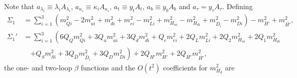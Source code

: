 \documentclass[preprint,amsmath,amssymb,aps,superscriptaddress,prd,showpacs,floatfix,nofootinbib]{revtex4-1}
\begin{document}
Note that $a_{\lambda_i}\equiv\lambda_i A_{\lambda_i}$, $a_{\kappa_i}\equiv\kappa_i A_{\kappa_i}$, $a_t\equiv y_t A_t$, $a_b\equiv y_b A_b$ and $a_\tau= y_\tau A_\tau$. Defining 
\begin{align}
\Sigma_1&=\sum_{i=1}^3\left ( m_{Qi}^2-2m_{ui}^2+m_{di}^2+m_{ei}^2-m_{Li}^2+m_{H_{ui}}^2-m_{H_{di}}^2+m_{\overline{D}_i}^2-m_{Di}^2\right )-m_{H'}^2+m_{\overline{H'}}^2,\label{eq:USSMGaugeSigmaTerm1}\\
\Sigma_1'&=\sum_{i=1}^3\left ( 6Q_Qm_{Qi}^2+3Q_um_{ui}^2+3Q_dm_{di}^2+Q_em_{ei}^2+2Q_Lm_{Li}^2+2Q_2m_{H_{ui}}^2+2Q_1m_{H_{di}}^2\right.\nonumber\\
&\quad{}\left.+Q_Sm_{Si}^2+3Q_{\overline{D}}m_{\overline{D}_i}^2+3Q_Dm_{Di}^2\right )+2Q_{H'}m_{H'}^2+2Q_{\overline{H'}}m_{\overline{H'}}^2,\label{eq:USSMGaugeSigmaTerm1Pr}
\end{align}
the one- and two-loop $\beta$ functions and the $O(t^2)$ coefficients for $m_{H_d}^2$ are
\end{document}
